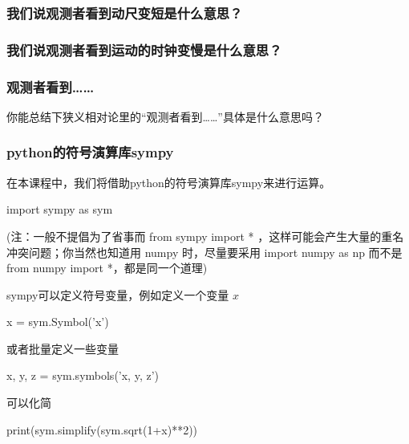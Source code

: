 \documentclass[CJK,13pt]{beamer}
\begin{document}
\begin{frame}
  \frametitle{我们说观测者看到动尺变短是什么意思？}
  
  
\end{frame}


\begin{frame}
  \frametitle{我们说观测者看到运动的时钟变慢是什么意思？}
  
\end{frame}


\begin{frame}
  \frametitle{观测者看到……}
  
  
  你能总结下狭义相对论里的“观测者看到……”具体是什么意思吗？
  
\end{frame}


\begin{frame}
  \frametitle{python的符号演算库sympy}
  在本课程中，我们将借助python的符号演算库sympy来进行运算。

  {\darkgreen import sympy as sym}

  {\scriptsize (注：一般不提倡为了省事而 from sympy import * ，这样可能会产生大量的重名冲突问题；你当然也知道用 numpy 时，尽量要采用 import numpy as np 而不是 from numpy import *，都是同一个道理)}

  \skiplines

  sympy可以定义符号变量，例如定义一个变量 $x$

 {\darkgreen x = sym.Symbol('x')}

  \skipline

  或者批量定义一些变量

  {\darkgreen x, y, z = sym.symbols('x, y, z')}

  \skipline
  
  可以化简

  {\darkgreen print(sym.simplify(sym.sqrt(1+x)**2))}
  

\end{frame}
\end{document}
